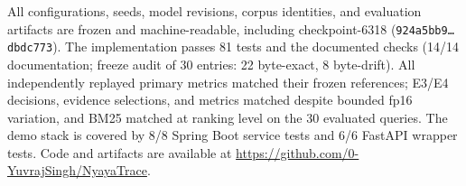 \documentclass[conference]{IEEEtran}
\begin{document}
All configurations, seeds, model revisions, corpus identities, and evaluation
artifacts are frozen and machine-readable, including checkpoint-6318
(\texttt{924a5bb9\ldots dbdc773}). The implementation passes 81
tests and the documented
checks (14/14 documentation; freeze audit of 30 entries:
22 byte-exact, 8 byte-drift).
All independently replayed primary metrics matched their frozen references; E3/E4
decisions, evidence selections, and metrics matched despite bounded fp16 variation,
and BM25 matched at ranking level on the 30 evaluated queries.
The demo stack is covered by 8/8 Spring Boot service tests and 6/6 FastAPI
wrapper tests. Code and artifacts are available
at \url{https://github.com/0-YuvrajSingh/NyayaTrace}.

\end{document}
